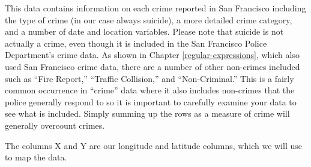 \documentclass[
  a4paper,
]{krantz}
\begin{document}
This data contains information on each crime reported in San
Francisco including the type of crime (in our case always
suicide), a more detailed crime category, and a number of
date and location variables. Please note that suicide is not
actually a crime, even though it is included in the San
Francisco Police Department's crime data. As shown in
Chapter \ref{regular-expressions}, which also used San
Francisco crime data, there are a number of other non-crimes
included such as ``Fire Report,'' ``Traffic Collision,'' and
``Non-Criminal.'' This is a fairly common occurrence in
``crime'' data where it also includes non-crimes that the
police generally respond to so it is important to carefully
examine your data to see what is included. Simply summing up
the rows as a measure of crime will generally overcount
crimes.

The columns X and Y are our longitude and latitude columns,
which we will use to map the data.
\end{document}
